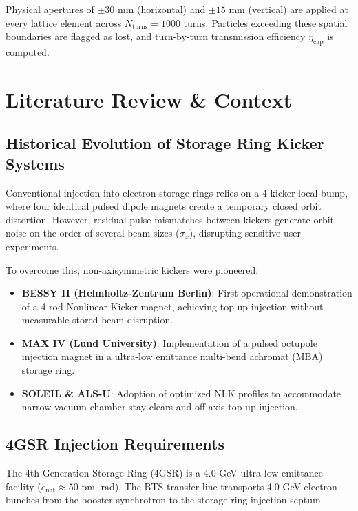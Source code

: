 \documentclass[11pt,a4paper]{article}
\begin{document}
Physical apertures of $\pm 30\text{ mm}$ (horizontal) and $\pm 15\text{ mm}$ (vertical) are applied at every lattice element across $N_{\text{turns}} = 1000$ turns. Particles exceeding these spatial boundaries are flagged as lost, and turn-by-turn transmission efficiency $\eta_{\text{cap}}$ is computed.

\section{Literature Review \& Context}

\subsection{Historical Evolution of Storage Ring Kicker Systems}
Conventional injection into electron storage rings relies on a 4-kicker local bump, where four identical pulsed dipole magnets create a temporary closed orbit distortion. However, residual pulse mismatches between kickers generate orbit noise on the order of several beam sizes ($\sigma_x$), disrupting sensitive user experiments.

To overcome this, non-axisymmetric kickers were pioneered:
\begin{itemize}
    \item \textbf{BESSY II (Helmholtz-Zentrum Berlin)}: First operational demonstration of a 4-rod Nonlinear Kicker magnet, achieving top-up injection without measurable stored-beam disruption.
    \item \textbf{MAX IV (Lund University)}: Implementation of a pulsed octupole injection magnet in a ultra-low emittance multi-bend achromat (MBA) storage ring.
    \item \textbf{SOLEIL \& ALS-U}: Adoption of optimized NLK profiles to accommodate narrow vacuum chamber stay-clears and off-axis top-up injection.
\end{itemize}

\subsection{4GSR Injection Requirements}
The 4th Generation Storage Ring (4GSR) is a 4.0 GeV ultra-low emittance facility ($e_{\text{nat}} \approx 50\text{ pm}\cdot\text{rad}$). The BTS transfer line transports 4.0 GeV electron bunches from the booster synchrotron to the storage ring injection septum.
\end{document}
